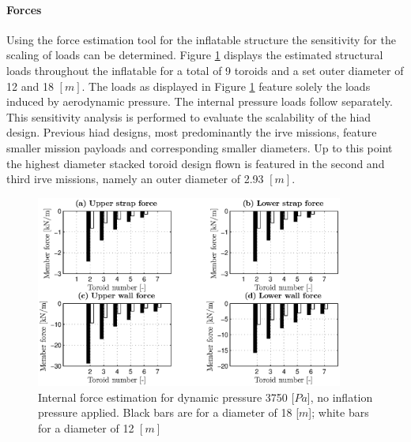 \paragraph{Forces}

Using the force estimation tool for the inflatable structure the sensitivity for the scaling of loads can be determined. Figure \ref{fig:forces} displays the estimated structural loads throughout the inflatable for a total of 9 toroids and a set outer diameter of 12 and 18 $[m]$. The loads as displayed in Figure \ref{fig:forces} feature solely the loads induced by aerodynamic pressure. The internal pressure loads follow separately. This sensitivity analysis is performed to evaluate the scalability of the \gls{hiad} design. Previous \gls{hiad} designs, most predominantly the \gls{irve} missions, feature smaller mission payloads and corresponding smaller diameters. Up to this point the highest diameter stacked toroid design flown is featured in the second and third \gls{irve} missions, namely an outer diameter of 2.93 $[m]$. 

\begin{figure}[ht]
	\centering
	\includegraphics[width=0.9\textwidth]{./Figure/Structure/forces_nopress_test.eps}
	\caption[{Internal force estimation for dynamic pressure 3750 [$Pa$], no inflation pressure applied}]{Internal force estimation for dynamic pressure 3750 [$Pa$], no inflation pressure applied. Black bars are for a diameter of 18 [$m$]; white bars for a diameter of 12 $[m]$}
	\label{fig:forces}
\end{figure}

